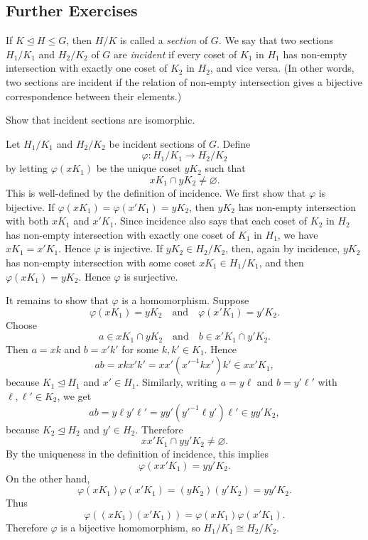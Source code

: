 \documentclass[../Odyssey_Project.tex]{subfiles}
\begin{document}
\subsection*{Further Exercises}

\noindent If $K \trianglelefteq H \leq G$, then $H/K$ is called a \emph{section} of $G$. We say that two sections $H_1/K_1$ and $H_2/K_2$ of $G$ are \emph{incident} if every coset of $K_1$ in $H_1$ has non-empty intersection with exactly one coset of $K_2$ in $H_2$, and vice versa. (In other words, two sections are incident if the relation of non-empty intersection gives a bijective correspondence between their elements.)

\begin{exercise}
\label{ex:1.11}
Show that incident sections are isomorphic.
\end{exercise}
\begin{solution}
Let \(H_1/K_1\) and \(H_2/K_2\) be incident sections of \(G\). Define
\[
    \varphi \colon H_1/K_1 \to H_2/K_2
\]
by letting \(\varphi(xK_1)\) be the unique coset \(yK_2\) such that
\[
    xK_1 \cap yK_2 \neq \varnothing .
\]
This is well-defined by the definition of incidence. We first show that \(\varphi\) is bijective. If \(\varphi(xK_1)=\varphi(x'K_1)=yK_2\), then \(yK_2\) has non-empty intersection with both \(xK_1\) and \(x'K_1\). Since incidence also says that each coset of \(K_2\) in \(H_2\) has non-empty intersection with exactly one coset of \(K_1\) in \(H_1\), we have \(xK_1=x'K_1\). Hence \(\varphi\) is injective. If \(yK_2 \in H_2/K_2\), then, again by incidence, \(yK_2\) has non-empty intersection with some coset \(xK_1 \in H_1/K_1\), and then \(\varphi(xK_1)=yK_2\). Hence \(\varphi\) is surjective.

It remains to show that \(\varphi\) is a homomorphism. Suppose
\[
    \varphi(xK_1)=yK_2
    \quad\text{and}\quad
    \varphi(x'K_1)=y'K_2.
\]
Choose
\[
    a \in xK_1 \cap yK_2
    \quad\text{and}\quad
    b \in x'K_1 \cap y'K_2.
\]
Then \(a=xk\) and \(b=x'k'\) for some \(k,k' \in K_1\). Hence
\[
    ab = xkx'k' = xx'(x'^{-1}kx')k' \in xx'K_1,
\]
because \(K_1 \trianglelefteq H_1\) and \(x' \in H_1\). Similarly, writing \(a=y\ell\) and \(b=y'\ell'\) with \(\ell,\ell' \in K_2\), we get
\[
    ab = y\ell y'\ell' = yy'(y'^{-1}\ell y')\ell' \in yy'K_2,
\]
because \(K_2 \trianglelefteq H_2\) and \(y' \in H_2\). Therefore
\[
    xx'K_1 \cap yy'K_2 \neq \varnothing .
\]
By the uniqueness in the definition of incidence, this implies
\[
    \varphi(xx'K_1)=yy'K_2.
\]
On the other hand,
\[
    \varphi(xK_1)\varphi(x'K_1)
    = (yK_2)(y'K_2)
    = yy'K_2.
\]
Thus
\[
    \varphi((xK_1)(x'K_1))
    = \varphi(xK_1)\varphi(x'K_1).
\]
Therefore \(\varphi\) is a bijective homomorphism, so \(H_1/K_1 \cong H_2/K_2\).
\end{solution}
\end{document}
